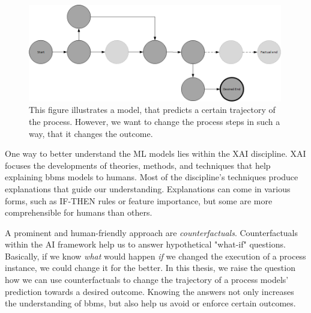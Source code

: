 \documentclass[./../../paper.tex]{subfiles}
\begin{document}
\begin{figure}[htb]
    \centering
    \includegraphics[width=0.99\textwidth]{figures/counterfactual_goal.png}
    \caption{This figure illustrates a model, that predicts a certain trajectory of the process. However, we want to change the process steps in such a way, that it changes the outcome.}
    \label{fig:desired_outcome}
\end{figure}

\noindent One way to better understand the \gls{ML} models lies within the \gls{XAI} discipline. XAI focuses the developments of theories, methods, and techniques that help explaining \glspl{bbm} models to humans. Most of the discipline's techniques produce explanations that guide our understanding. Explanations can come in various forms, such as IF-THEN rules\autocite[p.90]{molnar2019} or feature importance\autocite[p.45]{molnar2019}, but some are more comprehensible for humans than others. 

A prominent and human-friendly approach are \emph{counterfactuals}\autocite[p. 221]{molnar2019}. Counterfactuals within the AI framework help us to answer hypothetical "what-if" questions. Basically, if we know \emph{what} would happen \emph{if} we changed the execution of a process instance, we could change it for the better. In this thesis, we raise the question how we can use counterfactuals to change the trajectory of a process models' prediction towards a desired outcome. Knowing the answers not only increases the understanding of \glspl{bbm}, but also help us avoid or enforce certain outcomes. 
\end{document}
